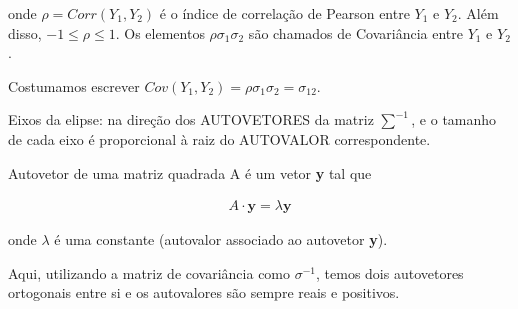 \documentclass[11pt,a4paper]{article}
\begin{document}
		onde $\rho=Corr(Y_1,Y_2)$ é o índice de correlação de Pearson entre $Y_1$ e $Y_2$.
		Além disso, $-1\leq\rho\leq1$.
		Os elementos $\rho\sigma_1\sigma_2$ são chamados de Covariância entre $Y_1$ e $Y_2$.
		
		Costumamos escrever $Cov(Y_1,Y_2)=\rho\sigma_1\sigma_2=\sigma_{12}$.
		
		Eixos da elipse: na direção dos AUTOVETORES da matriz $\sum^{-1}$, e o tamanho de cada eixo é proporcional à raiz do AUTOVALOR correspondente.
		
		Autovetor de uma matriz quadrada A é um vetor \textbf{y} tal que
		
		\begin{eqnarray*}
			A\cdot\textbf{y}=\lambda\textbf{y}
		\end{eqnarray*}
		
		onde $\lambda$ é uma constante (autovalor associado ao autovetor \textbf{y}).
		
		Aqui, utilizando a matriz de covariância como $\sigma^{-1}$, temos dois autovetores ortogonais entre si e os autovalores são sempre reais e positivos.
\end{document}
